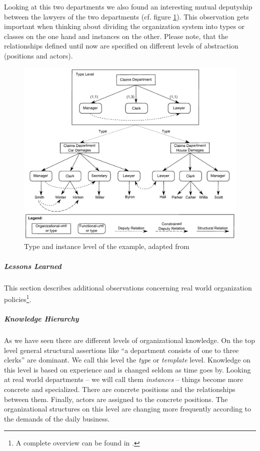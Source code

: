 Looking at this two departments we also found an interesting mutual deputyship between the lawyers of the two departments (cf. figure \ref{Example1}). This observation gets important when thinking about dividing the organization system into types or classes on the one hand and instances on the other. Please note, that the relationships defined until now are specified on different levels of abstraction (positions and actors).
	\begin{figure}[htb!]
	\centering
	\includegraphics[width=\textwidth]{Figures/alles.pdf}
	\caption{Type and instance level of the example, adapted from \cite[fig. 3]{Lawall2013}}
	\label{Example1}
	\end{figure}

\subparagraph{Lessons Learned}
	
This section describes additional observations concerning real world organization policies\footnote{A complete overview can be found in \cite{Schaller98}.}.

\subparagraph{Knowledge Hierarchy}
As we have seen there are different levels of organizational knowledge. On the top level general structural assertions like ``a department consists of one to three clerks'' are dominant. We call this level the \emph{type} or \emph{template} level. Knowledge on this level is based on experience and is changed seldom as time goes by. Looking at real world departments -- we will call them \emph{instances} -- things become more concrete and specialized. There are concrete positions and the relationships between them. Finally, actors are assigned to the concrete positions. The organizational structures on this level are changing more frequently according to the demands of the daily business. 
	
